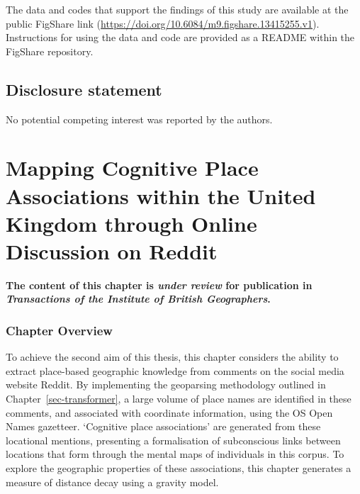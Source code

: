 \documentclass[
  letterpaper,
  11pt,
  english,
  onehalfspacing,
  headsepline]{MastersDoctoralThesis}
\begin{document}

The data and codes that support the findings of this study are available
at the public FigShare link
(\url{https://doi.org/10.6084/m9.figshare.13415255.v1}). Instructions
for using the data and code are provided as a README within the FigShare
repository.

\hypertarget{disclosure-statement}{%
\section*{Disclosure statement}\label{disclosure-statement}}


No potential competing interest was reported by the authors.


\hypertarget{sec-connections}{%
\chapter{Mapping Cognitive Place Associations within the United Kingdom
through Online Discussion on Reddit}\label{sec-connections}}


\textbf{The content of this chapter is \emph{under review} for
publication in \emph{Transactions of the Institute of British
Geographers}.}

\hypertarget{chapter-overview-1}{%
\subsection*{Chapter Overview}\label{chapter-overview-1}}

To achieve the second aim of this thesis, this chapter considers the
ability to extract place-based geographic knowledge from comments on the
social media website Reddit. By implementing the geoparsing methodology
outlined in Chapter~\ref{sec-transformer}, a large volume of place names
are identified in these comments, and associated with coordinate
information, using the OS Open Names gazetteer. `Cognitive place
associations' are generated from these locational mentions, presenting a
formalisation of subconscious links between locations that form through
the mental maps of individuals in this corpus. To explore the geographic
properties of these associations, this chapter generates a measure of
distance decay using a gravity model.
\end{document}
